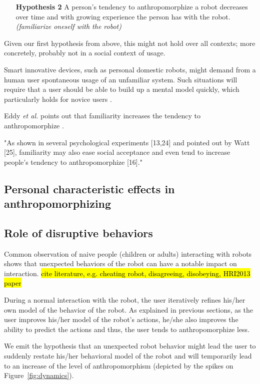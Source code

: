 \documentclass{frontiersSCNS} %
\begin{document}
\begin{itemize}
	\item[\textbf{Hypothesis 2}] A person's tendency to anthropomorphize a robot decreases over time and with growing experience the person has with the robot. \textit{(familiarize oneself with the robot)}
\end{itemize}	
	

Given our first hypothesis from above, this might not hold over all contexts;
more concretely, probably not in a social context of usage.


Smart innovative devices, such as personal domestic robots, might demand from a
human user spontaneous usage of an unfamiliar system. Such situations will
require that a user should be able to build up a mental model quickly, which
particularly holds for novice users \cite{schmitz_concepts_2011}.

Eddy \textit{et al.} points out that familiarity increases the tendency to
anthropomorphize \cite{eddy_attribution_1993}.

"As shown in several psychological experiments [13,24] and pointed out by Watt
[25], familiarity may also ease social acceptance and even tend to increase
people's tendency to anthropomorphize [16]." \cite{duffy_anthropomorphism_2003}

\subsection{Personal characteristic effects in anthropomorphizing}
\label{sec:8.3}

\subsection{Role of disruptive behaviors}
\label{sec:disruptive}

Common observation of naive people (children or adults) interacting with robots
shows that unexpected behaviors of the robot can have a notable impact on
interaction. \hl{cite literature, e.g. cheating robot, disagreeing, disobeying,
HRI2013 paper}

During a normal interaction with the robot, the user iteratively refines his/her
own model of the behavior of the robot. As explained in previous sections, as
the user improves his/her model of the robot's actions, he/she also improves the
ability to predict the actions and thus, the user tends to anthropomorphize
less.

We emit the hypothesis that an unexpected robot behavior might lead the user to
suddenly restate his/her behavioral model of the robot and will temporarily lead
to an increase of the level of anthropomorphism (depicted by the spikes on
Figure~\ref{fig:dynamics}).
\end{document}
